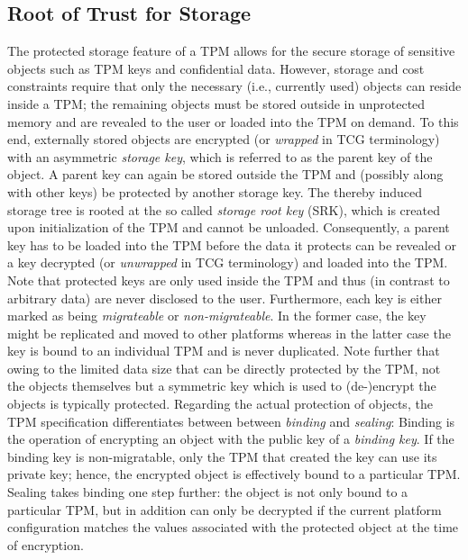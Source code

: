 \documentclass[11pt,letterpaper]{article}
\begin{document}
\subsection{Root of Trust for Storage}
The protected storage feature of a TPM allows for the secure storage of sensitive objects such
as TPM keys and confidential data. However, storage and cost constraints require that only the
necessary (i.e., currently used) objects can reside inside a TPM; the remaining objects must
be stored outside in unprotected memory and are revealed to the user or loaded into the TPM on
demand. To this end, externally stored objects are encrypted (or \emph{wrapped} in TCG terminology)
with an asymmetric \emph{storage key}, which is referred to as the parent key of the object. A
parent key can again be stored outside the TPM and (possibly along with other keys) be protected by
another storage key. The thereby induced storage tree is rooted at the so called \emph{storage root
key} (SRK), which is created upon initialization of the TPM and cannot be unloaded. Consequently,
a parent key has to be loaded into the TPM before the data it protects can be revealed or a key
decrypted (or \emph{unwrapped} in TCG terminology) and loaded into the TPM. Note that protected keys
are only used inside the TPM and thus (in contrast to arbitrary data) are never disclosed to the
user. Furthermore, each key is either marked as being \emph{migrateable} or \emph{non-migrateable}.
In the former case, the key might be replicated and moved to other platforms whereas in the latter
case the key is bound to an individual TPM and is never duplicated. Note further that owing to the
limited data size that can be directly protected by the TPM, not the objects themselves but a
symmetric key which is used to (de-)encrypt the objects is typically protected. Regarding the
actual protection of objects, the TPM specification differentiates between between \emph{binding}
and \emph{sealing}:
Binding is the operation of encrypting an object with the public key of a \emph{binding key}. If
the binding key is non-migratable, only the TPM that created the key can use its private key;
hence, the encrypted object is effectively bound to a particular TPM. Sealing takes binding one
step further: the object is not only bound to a particular TPM, but in addition can only be
decrypted if the current platform configuration matches the values associated with the protected
object at the time of encryption.
\end{document}
